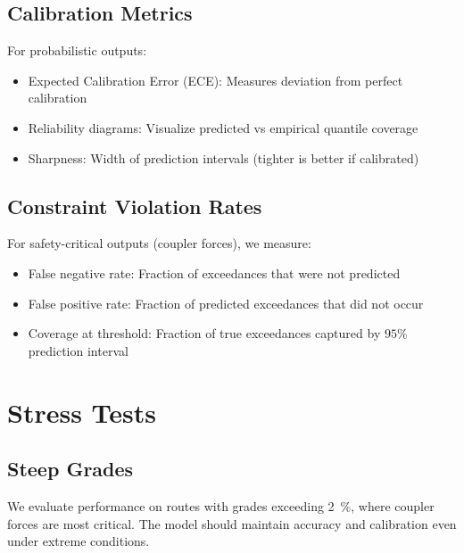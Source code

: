 
\subsection{Calibration Metrics}

For probabilistic outputs:
\begin{itemize}
    \item Expected Calibration Error (ECE): Measures deviation from perfect calibration
    \item Reliability diagrams: Visualize predicted vs empirical quantile coverage
    \item Sharpness: Width of prediction intervals (tighter is better if calibrated)
\end{itemize}


\subsection{Constraint Violation Rates}

For safety-critical outputs (coupler forces), we measure:
\begin{itemize}
    \item False negative rate: Fraction of exceedances that were not predicted
    \item False positive rate: Fraction of predicted exceedances that did not occur
    \item Coverage at threshold: Fraction of true exceedances captured by $95\%$ prediction interval
\end{itemize}


\section{Stress Tests}

\subsection{Steep Grades}

We evaluate performance on routes with grades exceeding \SI{2}{\percent}, where coupler forces are most critical. The model should maintain accuracy and calibration even under extreme conditions.

